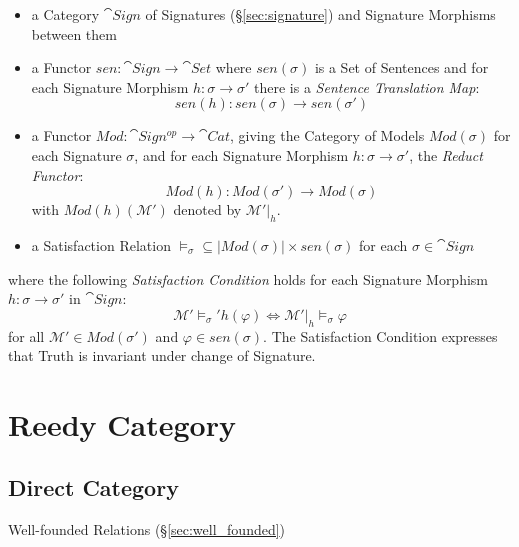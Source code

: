 \begin{itemize}
\item a Category $\cat{Sign}$ of Signatures (\S\ref{sec:signature})
  and Signature Morphisms between them
\item a Functor $sen : \cat{Sign} \rightarrow \cat{Set}$ where
  $sen(\sigma)$ is a Set of Sentences and for each Signature Morphism
  $h : \sigma \rightarrow \sigma'$ there is a \emph{Sentence
  Translation Map}:
  \[
  sen(h) : sen(\sigma) \rightarrow sen(\sigma')
  \]
\item a Functor $Mod : \cat{Sign^{op}} \rightarrow \cat{Cat}$,
  giving the Category of Models $Mod (\sigma)$ for each Signature
  $\sigma$, and for each Signature Morphism $h : \sigma \rightarrow
  \sigma'$, the \emph{Reduct Functor}:
  \[
  Mod(h) : Mod(\sigma') \rightarrow Mod(\sigma)
  \]
  with $Mod(h)(\mathcal{M}')$ denoted by $\mathcal{M}'|_h$.
\item a Satisfaction Relation $\models_\sigma \subseteq |Mod(\sigma)|
  \times sen(\sigma)$ for each $\sigma \in \cat{Sign}$
\end{itemize}
where the following \emph{Satisfaction Condition} holds for each
Signature Morphism $h : \sigma \rightarrow \sigma'$ in
$\cat{Sign}$:
\[
  \mathcal{M}' \models_\sigma' h(\varphi) \Leftrightarrow
  \mathcal{M}'|_h \models_\sigma \varphi
\]
for all $\mathcal{M}' \in Mod(\sigma')$ and $\varphi \in sen(\sigma)$.
The Satisfaction Condition expresses that Truth is invariant under
change of Signature.



\section{Reedy Category}\label{sec:reedy_category}




\subsection{Direct Category}\label{sec:direct_category}

Well-founded Relations (\S\ref{sec:well_founded})




